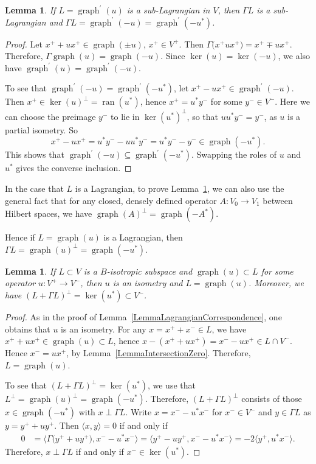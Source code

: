 \documentclass[10pt,a4paper]{amsart}
\numberwithin{equation}{section}
\newtheorem{Lemma}[Theorem]{Lemma}
\DeclareMathOperator*{\ran}{ran}
\DeclareMathOperator{\graph}{\mathrm{graph}}
\begin{document}
\begin{Lemma} \label{LemmaOrthogonalComplement}
If $L = \graph^\prime(u)$ is a sub-Lagrangian in $V$, then $\Gamma L$ is a sub-Lagrangian and $\Gamma L = \graph^\prime(-u) = \graph^\prime(-u^*)$.
\end{Lemma}

\begin{proof}
Let $x^+ + ux^+ \in \graph(\pm u)$, $x^+ \in V^+$.
Then $\Gamma\big(x^+ ux^+\big) = x^+ \mp u x^+$.
Therefore, $\Gamma\graph(u) = \graph(-u)$.
Since $\ker(u) = \ker(-u)$, we also have $\graph^\prime(u) = \graph^\prime(-u)$.

To see that $\graph^\prime(-u) = \graph^\prime(-u^*)$, let $x^+ - u x^+ \in \graph^\prime(-u)$.
Then $x^+ \in \ker(u)^\perp = \ran(u^*)$, hence $x^+ = u^* y^-$ for some $y^- \in V^-$.
Here we can choose the preimage $y^-$ to lie in $\ker(u^*)^\perp$, so that $uu^* y^-= y^-$, as $u$ is a partial isometry.
So
\[x^+ - u x^+ = u^*y^- - u u^* y^- = u^*y^- - y^- \in \graph(-u^*).\]
This shows that $\graph^\prime(-u) \subseteq \graph^\prime(-u^*)$.
Swapping the roles of $u$ and $u^*$ gives the converse inclusion.
\end{proof}

\begin{Remark}
In the case that $L$ is a Lagrangian, to prove Lemma~\ref{LemmaOrthogonalComplement}, we can also use the general fact that for any closed, densely defined operator $A\colon V_0 \to V_1$ between Hilbert spaces, we have $\graph(A)^\perp = \graph(-A^*)$.

Hence if $L = \graph(u)$ is a Lagrangian, then $\Gamma L = \graph(u)^\perp = \graph(-u^*)$.
\end{Remark}

\begin{Lemma} \label{LemmaLagrangianContainingGraph}
If $L \subset V$ is a $B$-isotropic subspace and $\graph(u) \subset L$ for some operator $u\colon V^+ \to V^-$, then $u$ is an isometry and $L = \graph(u)$.
Moreover, we have $(L + \Gamma L)^\perp = \ker(u^*) \subset V^-$.
\end{Lemma}

\begin{proof}
As in the proof of Lemma~\ref{LemmaLagrangianCorrespondence}, one obtains that $u$ is an isometry.
For any $x = {x^+ + x^- \in L}$, we have $x^+ + u x^+ \in \graph(u) \subset L$, hence $x - (x^+ + u x^+) = x^- - u x^+ \in L \cap V^-$.
Hence $x^- = u x^+$, by Lemma~\ref{LemmaIntersectionZero}.
Therefore, $L = \graph(u)$.

To see that $(L + \Gamma L)^\perp = \ker(u^*)$, we use that $L^\perp = \graph(u)^\perp = \graph(-u^*)$.
Therefore, $(L + \Gamma L)^\perp$ consists of those $x \in \graph(-u^*)$ with $x \perp \Gamma L$.
Write $x = x^- - u^*x^-$ for $x^- \in V^-$ and $y \in \Gamma L$ as $y = y^+ + u y^+$.
Then $\langle x, y \rangle = 0$ if and only if
\begin{align*}
 0 &= \big\langle \Gamma\big(y^+ + u y^+\big), x^- - u^* x^-\big\rangle = \big\langle y^+ - u y^+, x^- - u^* x^- \big\rangle = - 2\big\langle y^+, u^* x^-\big\rangle.
\end{align*}
Therefore, $x \perp \Gamma L$ if and only if $x^- \in \ker(u^*)$.
\end{proof}
\end{document}
